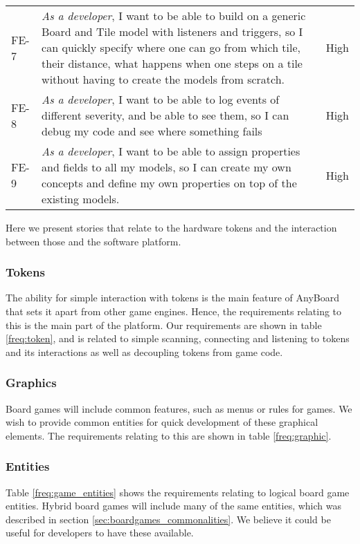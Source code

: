 \begin{table}
\begin{tabular}{ | m{1cm} | m{9cm}| m{1.5cm} | }
FE-7 & \emph{As a developer}, I want to be able to build on a generic Board and Tile model with listeners and triggers, so I can quickly specify where one can go from which tile, their distance, what happens when one steps on a tile without having to create the models from scratch. & High           \\
FE-8 & \emph{As a developer}, I want to be able to log events of different severity, and be able to see them, so I can debug my code and see where something fails                                                                                                                                                                    & High           \\
FE-9 & \emph{As a developer}, I want to be able to assign properties and fields to all my models, so I can create my own concepts and define my own properties on top of the existing models. & High
\end{tabular}
\end{table}

Here we present stories that relate to the hardware tokens and the interaction between those and the software platform.

\subsubsection{Tokens}
The ability for simple interaction with tokens is the main feature of AnyBoard that sets it apart from other game engines. Hence, the requirements relating to this is the main part of the platform. Our requirements are shown in table \ref{freq:token}, and is related to simple scanning, connecting and listening to tokens and its interactions as well as decoupling tokens from game code.

\subsubsection{Graphics}
Board games will include common features, such as menus or rules for games. We wish to provide common entities for quick development of these graphical elements. The requirements relating to this are shown in table \ref{freq:graphic}. 

\subsubsection{Entities}
Table \ref{freq:game_entities} shows the requirements relating to logical board game entities. Hybrid board games will include many of the same entities, which was described in section \ref{sec:boardgames_commonalities}. We believe it could be useful for developers to have these available.

\newpage

\newpage